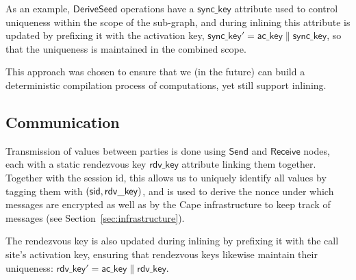 As an example, $\mathsf{DeriveSeed}$ operations have a $\mathsf{sync\_key}$ attribute used to control uniqueness within the scope of the sub-graph, and during inlining this attribute is updated by prefixing it with the activation key, $\mathsf{sync\_key}' = \mathsf{ac\_key} \| \mathsf{sync\_key}$, so that the uniqueness is maintained in the combined scope.

This approach was chosen to ensure that we (in the future) can build a deterministic compilation process of computations, yet still support inlining.


\subsection{Communication}

Transmission of values between parties is done using $\mathsf{Send}$ and $\mathsf{Receive}$ nodes, each with a static rendezvous key $\mathsf{rdv\_key}$ attribute linking them together. Together with the session id, this allows us to uniquely identify all values by tagging them with $(\mathsf{sid}, \mathsf{rdv\_key})$, and is used to derive the nonce under which messages are encrypted as well as by the Cape infrastructure to keep track of messages (see Section~\ref{sec:infrastructure}).

The rendezvous key is also updated during inlining by prefixing it with the call site's activation key, ensuring that rendezvous keys likewise maintain their uniqueness: $\mathsf{rdv\_key}' = \mathsf{ac\_key} \| \mathsf{rdv\_key}$.
